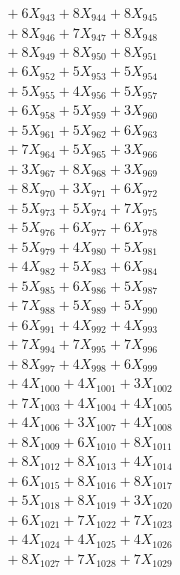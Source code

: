 \documentclass[a4paper,10pt]{article}
\begin{document}
{\begin{align}
&\;  + 6 X_{943} + 8 X_{944} + 8 X_{945} \\[0.3ex]
&\;  + 8 X_{946} + 7 X_{947} + 8 X_{948} \\[0.3ex]
&\;  + 8 X_{949} + 8 X_{950} + 8 X_{951} \\[0.3ex]
&\;  + 6 X_{952} + 5 X_{953} + 5 X_{954} \\[0.3ex]
&\;  + 5 X_{955} + 4 X_{956} + 5 X_{957} \\[0.3ex]
&\;  + 6 X_{958} + 5 X_{959} + 3 X_{960} \\[0.3ex]
&\;  + 5 X_{961} + 5 X_{962} + 6 X_{963} \\[0.3ex]
&\;  + 7 X_{964} + 5 X_{965} + 3 X_{966} \\[0.3ex]
&\;  + 3 X_{967} + 8 X_{968} + 3 X_{969} \\[0.5ex]\allowbreak
&\;  + 8 X_{970} + 3 X_{971} + 6 X_{972} \\[0.3ex]
&\;  + 5 X_{973} + 5 X_{974} + 7 X_{975} \\[0.3ex]
&\;  + 5 X_{976} + 6 X_{977} + 6 X_{978} \\[0.3ex]
&\;  + 5 X_{979} + 4 X_{980} + 5 X_{981} \\[0.3ex]
&\;  + 4 X_{982} + 5 X_{983} + 6 X_{984} \\[0.3ex]
&\;  + 5 X_{985} + 6 X_{986} + 5 X_{987} \\[0.3ex]
&\;  + 7 X_{988} + 5 X_{989} + 5 X_{990} \\[0.3ex]
&\;  + 6 X_{991} + 4 X_{992} + 4 X_{993} \\[0.3ex]
&\;  + 7 X_{994} + 7 X_{995} + 7 X_{996} \\[0.3ex]
&\;  + 8 X_{997} + 4 X_{998} + 6 X_{999} \\[0.5ex]\allowbreak
&\;  + 4 X_{1000} + 4 X_{1001} + 3 X_{1002} \\[0.3ex]
&\;  + 7 X_{1003} + 4 X_{1004} + 4 X_{1005} \\[0.3ex]
&\;  + 4 X_{1006} + 3 X_{1007} + 4 X_{1008} \\[0.3ex]
&\;  + 8 X_{1009} + 6 X_{1010} + 8 X_{1011} \\[0.3ex]
&\;  + 8 X_{1012} + 8 X_{1013} + 4 X_{1014} \\[0.3ex]
&\;  + 6 X_{1015} + 8 X_{1016} + 8 X_{1017} \\[0.3ex]
&\;  + 5 X_{1018} + 8 X_{1019} + 3 X_{1020} \\[0.3ex]
&\;  + 6 X_{1021} + 7 X_{1022} + 7 X_{1023} \\[0.3ex]
&\;  + 4 X_{1024} + 4 X_{1025} + 4 X_{1026} \\[0.3ex]
&\;  + 8 X_{1027} + 7 X_{1028} + 7 X_{1029} \\[0.5ex]\allowbreak

\end{align}}
\end{document}
